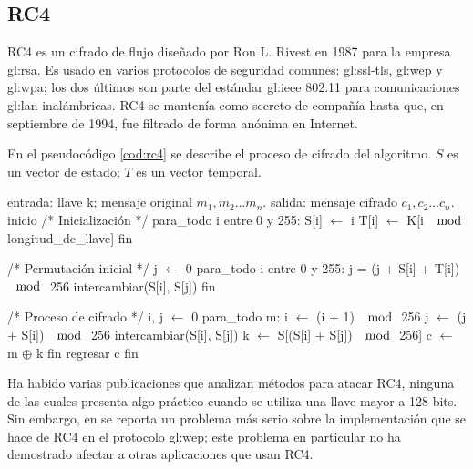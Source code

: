 %
%

\subsection{RC4}

RC4 es un cifrado de flujo diseñado por Ron L. Rivest en 1987 para la empresa
\acrshort{gl:rsa}. Es usado en varios protocolos de seguridad comunes:
\acrfull{gl:ssl-tls}, \acrfull{gl:wep} y \acrfull{gl:wpa}; los dos últimos son
parte del estándar \acrshort{gl:ieee} 802.11 para comunicaciones
\acrshort{gl:lan} inalámbricas. RC4 se mantenía como secreto de compañía hasta
que, en septiembre de 1994, fue filtrado de forma anónima en Internet.

En el pseudocódigo \ref{cod:rc4} se describe el proceso de cifrado del
algoritmo. $ S $ es un vector de estado; $ T $ es un vector temporal.

\begin{pseudocodigo}[%
    caption={Proceso de cifrado de RC4.},
    label={cod:rc4}%
  ]
  entrada: llave k; mensaje original $ m_1, m_2 \dots m_n $.
  salida:  mensaje cifrado $ c_1, c_2 \dots c_n $.
  inicio
    /* Inicialización */
    para_todo i entre 0 y 255:
      S[i] $\gets$ i
      T[i] $\gets$ K[i $\mod$ longitud_de_llave]
    fin

    /* Permutación inicial */
    j $\gets$ 0
    para_todo i entre 0 y 255:
      j = (j + S[i] + T[i]) $\mod$ 256
      intercambiar(S[i], S[j])
    fin

    /* Proceso de cifrado */
    i, j $\gets$ 0
    para_todo m:
      i $\gets$ (i + 1) $\mod$ 256
      j $\gets$ (j + S[i]) $\mod$ 256
      intercambiar(S[i], S[j])
      k $\gets$ S[(S[i] + S[j]) $\mod$ 256]
      c $\gets$ m $\oplus$ k
    fin
    regresar c
  fin
\end{pseudocodigo}

Ha habido varias publicaciones que analizan métodos para atacar RC4, ninguna
de las cuales presenta algo práctico cuando se utiliza una llave mayor a
128 bits. Sin embargo, en \cite{ataque_wep} se reporta un problema más serio
sobre la implementación que se hace de RC4 en el protocolo \acrshort{gl:wep};
este problema en particular no ha demostrado afectar a otras aplicaciones que
usan RC4.
